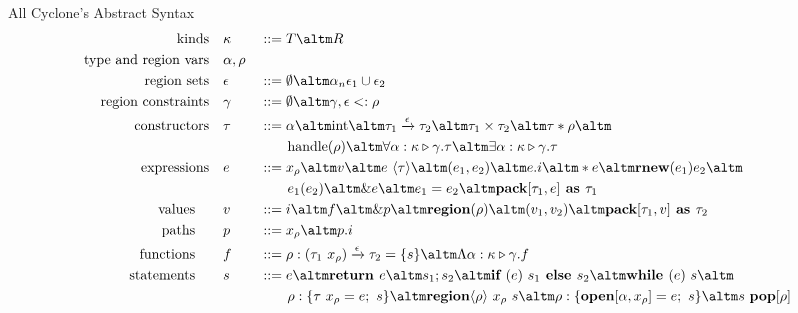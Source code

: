 \begin{frame}{All Cyclone's Abstract Syntax}
\scriptsize{
\begin{alignat*}{2}
\text{kinds}\quad &\kappa &&::= T \altm R
\\
\text{type and region vars}\quad &\alpha,\rho &&
\\
\text{region sets}\quad &\epsilon &&::= \emptyset \altm \alpha_n \epsilon_1 \cup \epsilon_2
\\
\text{region constraints} \quad &\gamma &&::= \emptyset \altm \gamma, \epsilon <: \rho
\\
\text{constructors} \quad &\tau &&::= \alpha \altm \text{int} \altm \tau_1 \xrightarrow[]{\epsilon} \tau_2 \altm \tau_1 \times \tau_2 \altm \tau \ast \rho \altm
\\
~ & ~ && \qquad \text{handle}(\rho) \altm \forall\alpha:\kappa \triangleright \gamma.\tau \altm \exists \alpha:\kappa \triangleright \gamma.\tau
\\
\text{expressions} \quad &e &&::= x_\rho \altm v \altm e\ \langle\tau\rangle \altm (e_1,e_2) \altm e.i \altm \ast e \altm \textbf{rnew}(e_1)e_2 \altm
\\
~ & ~ && \qquad e_1(e_2) \altm \&e \altm e_1 = e_2 \altm \textbf{pack} [\tau_1, e]\textbf{ as } \tau_1
\\
\text{values} \qquad &v &&::= i \altm f \altm \&p \altm \textbf{region}(\rho) \altm (v_1, v_2) \altm \textbf{pack}[\tau_1,v]\textbf{ as } \tau_2
\\
\text{paths} \qquad &p &&::= x_\rho \altm p.i
\\
\text{functions} \qquad &f &&::= \rho:(\tau_1\ x_{\rho}) \xrightarrow[]{\epsilon} \tau_2 = \{s\} \altm \Lambda\alpha:\kappa \triangleright \gamma.f
\\
\text{statements} \qquad &s &&::= e \altm \textbf{return } e \altm s_1;s_2 \altm \textbf{if } (e)\ s_1 \textbf{ else } s_2 \altm \textbf{while } (e)\ s \altm
\\
~ & ~ && \qquad \rho:\{\tau\ x_\rho = e;\ s\} \altm \textbf{region}\langle\rho\rangle\ x_{\rho}\ s \altm \rho:\{\textbf{open}[\alpha,x_{\rho}] = e;\ s\} \altm s\ \textbf{pop}[\rho]
\end{alignat*}
    }
\end{frame}

